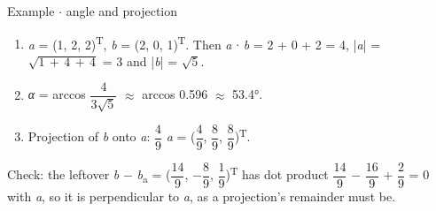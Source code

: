 \documentclass[11pt]{article}
\begin{document}
\begin{keepsection}
\begin{workedbox}{Example \ensuremath{\cdot} angle and projection}
\begin{enumerate}
\item \textit{a} = (1, 2, 2)\textsuperscript{T}, \textit{b} = (2, 0, 1)\textsuperscript{T}. Then \textit{a} \ensuremath{\cdot} \textit{b} = 2 + 0 + 2 = 4, |\textit{a}| = \ensuremath{\sqrt{1\, +\, 4\, +\, 4}} = 3 and |\textit{b}| = \ensuremath{\sqrt{5}}.
\item \textit{α} = arccos {\small\ensuremath{\dfrac{4}{3\sqrt{5}}}} \ensuremath{\approx} arccos 0.596 \ensuremath{\approx} 53.4°.
\item Projection of \textit{b} onto \textit{a}: {\small\ensuremath{\dfrac{4}{9}}} \textit{a} = ({\small\ensuremath{\dfrac{4}{9}}}, {\small\ensuremath{\dfrac{8}{9}}}, {\small\ensuremath{\dfrac{8}{9}}})\textsuperscript{T}.
\end{enumerate}

Check: the leftover \textit{b} \ensuremath{-} \textit{b}\textsubscript{a} = ({\small\ensuremath{\dfrac{14}{9}}}, \ensuremath{-}{\small\ensuremath{\dfrac{8}{9}}}, {\small\ensuremath{\dfrac{1}{9}}})\textsuperscript{T} has dot product {\small\ensuremath{\dfrac{14}{9}}} \ensuremath{-} {\small\ensuremath{\dfrac{16}{9}}} + {\small\ensuremath{\dfrac{2}{9}}} = 0 with \textit{a}, so it is perpendicular to \textit{a}, as a projection's remainder must be.
\end{workedbox}
\end{keepsection}
\end{document}
